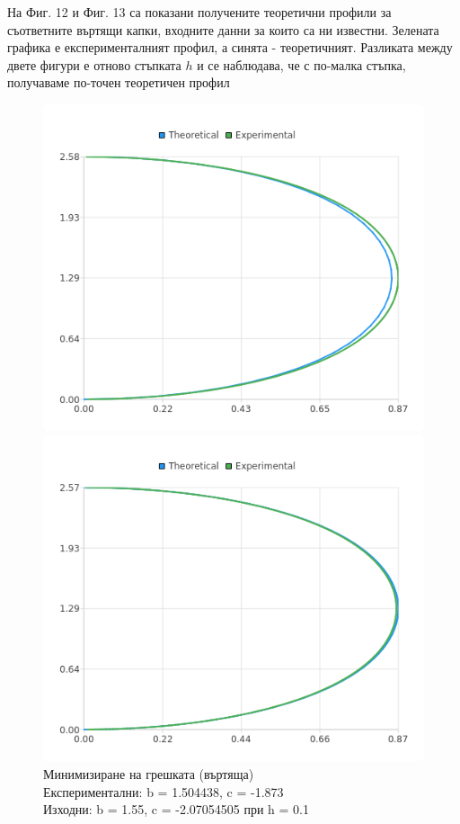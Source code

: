 \documentclass{article}
\begin{document}
На Фиг. 12 и Фиг. 13 са показани получените теоретични профили за съответните въртящи капки, входните данни за които са ни известни. Зелената графика е експерименталният профил, а синята - теоретичният. Разликата между двете фигури е отново стъпката \(h\) и се наблюдава, че с по-малка стъпка, получаваме по-точен теоретичен профил

\begin{figure}[H]
\centering
\begin{minipage}{0.5\textwidth}
  \centering
  \includegraphics[width=1\linewidth]{gradient-descent-2-0.1.png}
  \caption{Минимизиране на грешката (въртяща) \protect\\ Експериментални: b = 1.504438, c = -1.873 \protect\\ Изходни: b = 1.55, c = -2.07054505 при h = 0.1}
\end{minipage}%
\begin{minipage}{0.5\textwidth}
  \centering
  \includegraphics[width=1\linewidth]{gradient-descent-2-0.01.png}

\end{minipage}
\end{figure}
\end{document}
